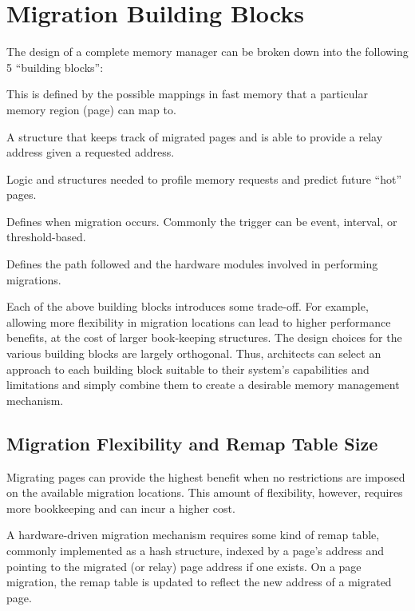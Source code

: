 \section{Migration Building Blocks}
\label{sec:buildingblocks}
The design of a complete memory manager can be broken down into the following 5 ``building blocks'':
\begin{description}[style=unboxed,leftmargin=0cm]
\setlength\itemsep{0em}
\item [Migration flexibility:] This is defined by the possible mappings in 
fast memory that a particular memory region (page) can map to.
\item [Remap table:] A structure that keeps track of migrated pages and is able to provide a relay address given a requested address.
\item [Activity tracking:] Logic and structures needed to profile memory requests and predict future ``hot'' pages.
\item [Migration trigger:] Defines when migration occurs. Commonly the trigger can be event, interval, or threshold-based.
\item [Migration driver/datapath:] Defines the path followed and the hardware modules involved in performing migrations.
\end{description}

Each of the above building blocks introduces some trade-off. For example, allowing more flexibility in migration locations can lead to higher performance benefits, at the cost of larger book-keeping structures.  The design choices for the various building blocks are largely
orthogonal.  Thus, architects can select an approach to each building block suitable to their system's capabilities and limitations and simply combine them to create a desirable memory management mechanism.

\subsection{Migration Flexibility and Remap Table Size}
\label{sec:relocation}

Migrating pages can provide the highest benefit when no restrictions are imposed on the available migration locations.  This amount of flexibility, however,
requires more bookkeeping and can incur a higher cost.

A hardware-driven migration mechanism requires some kind of remap table,
commonly implemented as a hash structure, indexed by a page's address and pointing to the migrated (or relay) page address if one exists. On a page migration, the remap table is updated to reflect the new address of a migrated page. 

